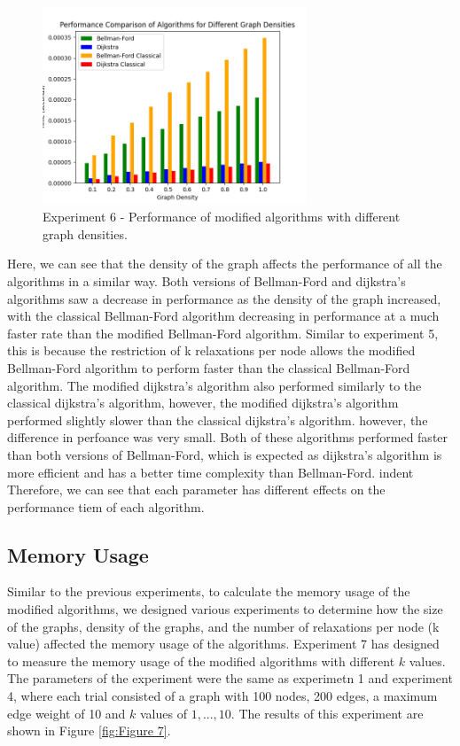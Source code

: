 \documentclass{article}
\begin{document}
\begin{onehalfspace}
\begin{figure}[H] 
    \centering
    \includegraphics[width=0.7\textwidth]{Figures/Performance_densities.png} 
    \caption{\footnotesize Experiment 6 - Performance of modified algorithms with different graph densities.}
    \label{fig:Figure 6} 
\end{figure}

\newpage

Here, we can see that the density of the graph affects the performance of all the algorithms in a similar way.
Both versions of Bellman-Ford and dijkstra's algorithms saw a decrease in performance as the density of the graph increased, with the classical Bellman-Ford algorithm decreasing in performance at a much faster rate than the modified Bellman-Ford algorithm.
Similar to experiment 5, this is because the restriction of k relaxations per node allows the modified Bellman-Ford algorithm to perform faster than the classical Bellman-Ford algorithm.
The modified dijkstra's algorithm also performed similarly to the classical dijkstra's algorithm,
however, the modified dijkstra's algorithm performed slightly slower than the classical dijkstra's algorithm. however, the difference in perfoance was very small. 
Both of these algorithms performed faster than both versions of Bellman-Ford, which is expected as dijkstra's algorithm is more efficient and has a better time complexity than Bellman-Ford.
\smallskip
\newline
indent
Therefore, we can see that each parameter has different effects on the performance tiem of each algorithm.

\subsection*{Memory Usage}
Similar to the previous experiments, to calculate the memory usage of the modified algorithms, we designed various experiments to determine how the size of the graphs, density of the graphs, and the number of relaxations per node (k value) affected the memory usage of the algorithms.
\smallskip
\newline
\indent
Experiment 7 has designed to measure the memory usage of the modified algorithms with different $k$ values. The 
parameters of the experiment were the same as experimetn 1 and experiment 4, where each trial consisted of a graph with 100 nodes, 200 edges, a maximum edge weight of 10 and $k$ values of $1, ... , 10$.
The results of this experiment are shown in Figure \ref{fig:Figure 7}.


\end{onehalfspace}
\end{document}
